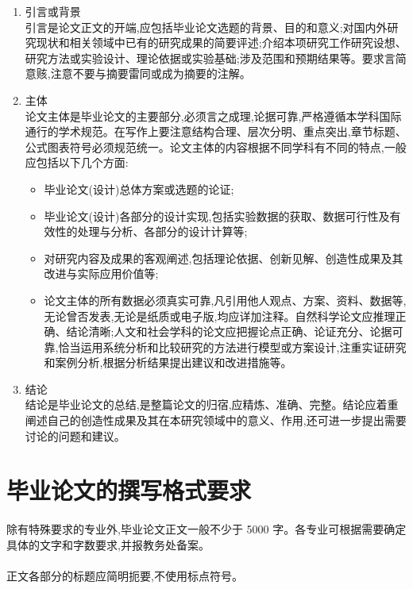 ﻿\documentclass{sysuthesis}
\begin{document}
\begin{enumerate}
\item 引言或背景\\
引言是论文正文的开端,应包括毕业论文选题的背景、目的和意义;对国内外研究现状和相关领域中已有的研究成果的简要评述;介绍本项研究工作研究设想、研究方法或实验设计、理论依据或实验基础;涉及范围和预期结果等。要求言简意赅,注意不要与摘要雷同或成为摘要的注解。
\item 主体\\
论文主体是毕业论文的主要部分,必须言之成理,论据可靠,严格遵循本学科国际通行的学术规范。在写作上要注意结构合理、层次分明、重点突出,章节标题、公式图表符号必须规范统一。论文主体的内容根据不同学科有不同的特点,一般应包括以下几个方面:
\begin{itemize}
\item 毕业论文(设计)总体方案或选题的论证;
\item 毕业论文(设计)各部分的设计实现,包括实验数据的获取、数据可行性及有效性的处理与分析、各部分的设计计算等;
\item 对研究内容及成果的客观阐述,包括理论依据、创新见解、创造性成果及其改进与实际应用价值等;
\item 论文主体的所有数据必须真实可靠,凡引用他人观点、方案、资料、数据等,无论曾否发表,无论是纸质或电子版,均应详加注释。自然科学论文应推理正确、结论清晰;人文和社会学科的论文应把握论点正确、论证充分、论据可靠,恰当运用系统分析和比较研究的方法进行模型或方案设计,注重实证研究和案例分析,根据分析结果提出建议和改进措施等。
\end{itemize}
\item 结论\\
结论是毕业论文的总结,是整篇论文的归宿,应精炼、准确、完整。结论应着重阐述自己的创造性成果及其在本研究领域中的意义、作用,还可进一步提出需要讨论的问题和建议。
\end{enumerate}

\section{毕业论文的撰写格式要求}

\paragraph{}除有特殊要求的专业外,毕业论文正文一般不少于 5000 字。各专业可根据需要确定具体的文字和字数要求,并报教务处备案。

\paragraph{}正文各部分的标题应简明扼要,不使用标点符号。
\end{document}

